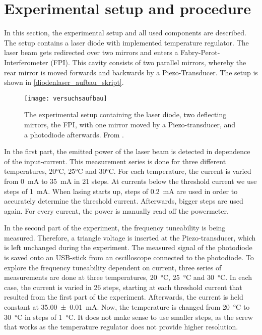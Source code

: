 \section{Experimental setup and procedure}\label{sec:procedure}
In this section, the experimental setup and all used components are described. The setup contains a laser diode with implemented temperature regulator. The laser beam gets redirected over two mirrors and enters a Fabry-Perot-Interferometer (FPI). This cavity consists of two parallel mirrors, whereby the rear mirror is moved forwards and backwards by a Piezo-Transducer. The setup is shown in \autoref{diodenlaser_aufbau_skript}. 

\begin{figure}[H]
	\centering
	\texttt{[image: versuchsaufbau]}
	\caption{The experimental setup containing the laser diode, two deflecting mirrors, the FPI, with one mirror moved by a Piezo-transducer, and a photodiode afterwards. From \cite{diodenlaser}. }
	\label{diodenlaser_aufbau_skript} 
\end{figure}

In the first part, the emitted power of the laser beam is detected in dependence of the input-current. This measurement series is done for three different temperatures, $20 \unit{\degreeCelsius}$, $25 \unit{\degreeCelsius}$ and $30 \unit{\degreeCelsius}$. For each temperature, the current is varied from \SI{0}{mA} to \SI{35}{mA} in 21 steps. At currents below the threshold current we use steps of \SI{1}{mA}. When lasing starts up, steps of \SI{0.2}{mA} are used in order to accurately determine the threshold current. Afterwards, bigger steps are used again. For every current, the power is manually read off the powermeter. 

In the second part of the experiment, the frequency tuneability is being measured. Therefore, a triangle voltage is inserted at the Piezo-transducer, which is left unchanged during the experiment. The measured signal of the photodiode is saved onto an USB-stick from an oscilloscope connected to the photodiode. To explore the frequency tuneability dependent on current, three series of measurements are done at three temperatures, \SI{20}{\degreeCelsius}, \SI{25}{\degreeCelsius} and \SI{30}{\degreeCelsius}. In each case, the current is varied in 26 steps, starting at each threshold current that resulted from the first part of the experiment. Afterwards, the current is held constant at \SI{35.00(1)}{mA}. Now, the temperature is changed from \SI{20}{\degreeCelsius} to \SI{30}{\degreeCelsius} in steps of \SI{1}{\degreeCelsius}. It does not make sense to use smaller steps, as the screw that works as the temperature regulator does not provide higher resolution. 



